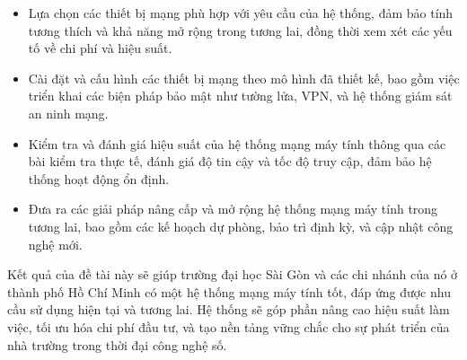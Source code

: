 \documentclass[12pt, a4paper]{article}
\begin{document}
\begin{flushleft}
\begin{itemize}[leftmargin=2.3cm, itemsep=0pt, topsep=0pt]
			\item  Lựa chọn các thiết bị mạng phù hợp với yêu cầu của hệ thống, đảm bảo tính tương thích và khả năng mở rộng trong tương lai, đồng thời xem xét các yếu tố về chi phí và hiệu suất.
			\item  Cài đặt và cấu hình các thiết bị mạng theo mô hình đã thiết kế, bao gồm việc triển khai các biện pháp bảo mật như tường lửa, VPN, và hệ thống giám sát an ninh mạng.
			\item  Kiểm tra và đánh giá hiệu suất của hệ thống mạng máy tính thông qua các bài kiểm tra thực tế, đánh giá độ tin cậy và tốc độ truy cập, đảm bảo hệ thống hoạt động ổn định.
			\item  Đưa ra các giải pháp nâng cấp và mở rộng hệ thống mạng máy tính trong tương lai, bao gồm các kế hoạch dự phòng, bảo trì định kỳ, và cập nhật công nghệ mới.
		\end{itemize}
		\hspace{1.5cm}Kết quả của đề tài này sẽ giúp trường đại học Sài Gòn và các chi nhánh của nó ở thành phố Hồ Chí Minh có một hệ thống mạng máy tính tốt, đáp ứng được nhu cầu sử dụng hiện tại và tương lai. Hệ thống sẽ góp phần nâng cao hiệu suất làm việc, tối ưu hóa chi phí đầu tư, và tạo nền tảng vững chắc cho sự phát triển của nhà trường trong thời đại công nghệ số.
	\end{flushleft}
	
	\newpage
\end{document}

